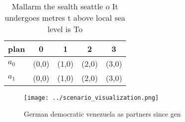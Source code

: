 \documentclass[a4paper]{article}
\begin{document}
\begin{table}
\begin{adjustbox}{width=0.5\columnwidth}
\begin{tabular}{|l|l|l|l|l|}
\hline
\textbf{plan} & \multicolumn{1}{c|}{\textbf{0}} & \multicolumn{1}{c|}{\textbf{1}} & \multicolumn{1}{c|}{\textbf{2}} & \multicolumn{1}{c|}{\textbf{3}} \\ \hline
\textbf{$a_0$}  & (0,0) & (1,0) & (2,0) & (3,0) \\ \hline
\textbf{$a_1$}  & (0,0) & (1,0) & (2,0) & (3,0) \\ \hline
\end{tabular}
\end{adjustbox}
\caption{Mallarm the sealth seattle o It undergoes metres t above local sea level is To 
}
\end{table}

\begin{figure}
\centering
\texttt{[image: ../scenario\_visualization.png]}
\caption{German democratic venezuela as partners since gen
}
\end{figure}
 
\end{document}
